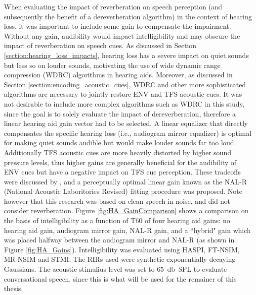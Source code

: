 When evaluating the impact of reverberation on speech perception (and subsequently the benefit of a dereverberation algorithm) in the context of hearing loss, it was important to include some gain to compensate the impairment. Without any gain, audibility would impact intelligibility and may obscure the impact of reverberation on speech cues. As discussed in Section \ref{section:hearing_loss_impacts}, hearing loss has a severe impact on quiet sounds but less so on louder sounds, motivating the use of wide dynamic range compression (WDRC) algorithms in hearing aids. Moreover, as discussed in Section \ref{section:encoding_acoustic_cues}, WDRC and other more sophisticated algorithms are necessary to jointly restore ENV and TFS acoustic cues.  It was not desirable to include more complex algorithms such as WDRC in this study, since the goal is to solely evaluate the impact of dereverberation, therefore a linear hearing aid gain vector had to be selected. A linear equalizer that directly compensates the specific hearing loss (i.e., audiogram mirror equalizer) is optimal for making quiet sounds audible but would make louder sounds far too loud. Additionally TFS acoustic cues are more heavily distorted by higher sound pressure levels, thus higher gains are generally beneficial for the audibility of ENV cues but have a negative impact on TFS cue perception. These tradeoffs were discussed by \cite{byrne1986national}, and a perceptually optimal linear gain known as the NAL-R (National Acoustic Laboritories Revised) fitting procedure was proposed. Note however that this research was based on clean speech in noise, and did not consider reverberation. Figure \ref{fig:HA_GainComparison} shows a comparison on the basis of intelligibility as a function of T60 of four hearing aid gains: no hearing aid gain, audiogram mirror gain, NAL-R gain, and a ``hybrid" gain which was placed halfway between the audiogram mirror and NAL-R (as shown in Figure \ref{fig:HA_Gains}). Intelligibility was evaluated using HASPI, FT-NSIM, MR-NSIM and STMI. The RIRs used were synthetic exponentially decaying Gaussians. The acoustic stimulius level was set to \qty{65}{\decibel SPL} to evaluate conversational speech, since this is what will be used for the remainer of this thesis.

%
%
%
%
%

